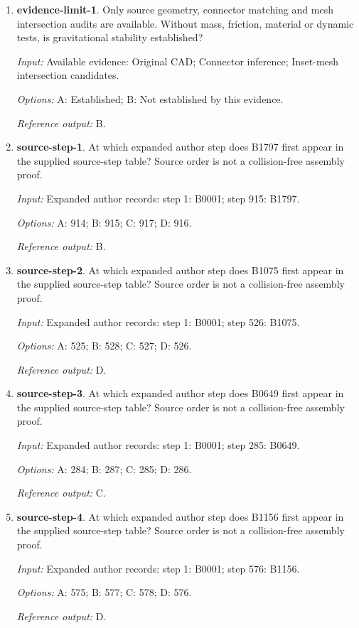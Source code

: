 \begin{enumerate}
\item \textbf{evidence-limit-1}. Only source geometry, connector matching and mesh intersection audits are available. Without mass, friction, material or dynamic tests, is gravitational stability established?\par {\small \textit{Input:} Available evidence: Original CAD; Connector inference; Inset-mesh intersection candidates. \par\textit{Options:} A: Established; B: Not established by this evidence. \par\textit{Reference output:} B.}
\item \textbf{source-step-1}. At which expanded author step does B1797 first appear in the supplied source-step table? Source order is not a collision-free assembly proof.\par {\small \textit{Input:} Expanded author records: step 1: B0001; step 915: B1797. \par\textit{Options:} A: 914; B: 915; C: 917; D: 916. \par\textit{Reference output:} B.}
\item \textbf{source-step-2}. At which expanded author step does B1075 first appear in the supplied source-step table? Source order is not a collision-free assembly proof.\par {\small \textit{Input:} Expanded author records: step 1: B0001; step 526: B1075. \par\textit{Options:} A: 525; B: 528; C: 527; D: 526. \par\textit{Reference output:} D.}
\item \textbf{source-step-3}. At which expanded author step does B0649 first appear in the supplied source-step table? Source order is not a collision-free assembly proof.\par {\small \textit{Input:} Expanded author records: step 1: B0001; step 285: B0649. \par\textit{Options:} A: 284; B: 287; C: 285; D: 286. \par\textit{Reference output:} C.}
\item \textbf{source-step-4}. At which expanded author step does B1156 first appear in the supplied source-step table? Source order is not a collision-free assembly proof.\par {\small \textit{Input:} Expanded author records: step 1: B0001; step 576: B1156. \par\textit{Options:} A: 575; B: 577; C: 578; D: 576. \par\textit{Reference output:} D.}

\end{enumerate}
